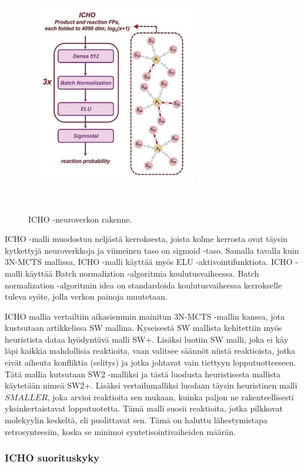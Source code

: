 \documentclass[finnish,twoside,censored,tkt,sw-line]{HYthesisML}
\begin{document}
\begin{figure}[ht]
    \centering
    \includegraphics[width=8cm, height=8cm]{icho-neuralnetwork.png}
    \caption{ICHO -neuroverkon rakenne.}
    {~\cite{ExpertKnowledgeRetorsynthesis}}
\end{figure}

ICHO -malli muodostuu neljästä kerroksesta, joista kolme kerrosta ovat täysin kytkettyjä neuroverkkoja ja viimeinen taso on sigmoid -taso.
Samalla tavalla kuin 3N-MCTS mallissa, ICHO -malli käyttää myös ELU -aktivointifunktiota.
ICHO -malli käyttää Batch normaliztion -algoritmia koulutusvaiheessa.
Batch normalization -algoritmin idea on standardoida koulutusvaiheessa kerrokselle tuleva syöte, jolla verkon painoja muutetaan.

ICHO mallia vertailtiin aikasiemmin mainitun 3N-MCTS -mallin kanssa, jota kustsutaan artikkelissa SW mallina.
Kyseisestä SW mallista kehitettiin myös heuristista dataa hyödyntävä malli SW+.
Lisäksi luotiin SW malli, joka ei käy läpi kaikkia mahdollisia reaktioita, vaan valitsee säännöt niistä reaktioista, jotka eivät aiheuta konfliktia (selitys) ja jotka johtavat vain tiettyyn lopputuotteeseen.
Tätä mallia kutsutaan SW2 -malliksi ja tästä luodusta heuristisesta mallista käytetään nimeä SW2+.
Lisäksi vertailumalliksi luodaan täysin heuristinen malli \(SMALLER\), joka arvioi reaktioita sen mukaan, kuinka paljon ne rakenteellisesti yksinkertaistavat lopputuotetta.
Tämä malli suosii reaktioita, jotka pilkkovat molekyylin keskeltä, eli puolittavat sen.
Tämä on haluttu lähestymistapa retrosynteesiin, koska se minimoi syntetisointivaiheiden määrän.

\subsubsection{ICHO suorituskyky}
\end{document}

